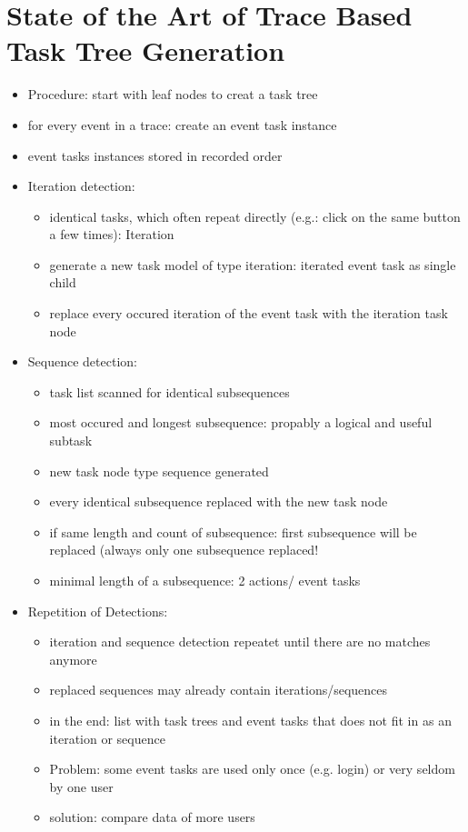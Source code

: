 \section{State of the Art of Trace Based Task Tree Generation}
\begin{itemize}
	\item Procedure: start with leaf nodes to creat a task tree
 	\item for every event in a trace: create an event task instance
  	\item event tasks instances stored in recorded order

	\item Iteration detection:
	\begin{itemize} 
		\item identical tasks, which often repeat directly (e.g.: click on the same button a few times): Iteration
		\item generate a new task model of type iteration: iterated event task as single child
		\item replace every occured iteration of the event task with the iteration task node 
	\end{itemize}

	\item Sequence detection:
	\begin{itemize}
		\item task list scanned for identical subsequences
    		\item most occured and longest subsequence: propably a logical and useful subtask
		\item new task node type sequence generated
		\item every identical subsequence replaced with the new task node 
		\item if same length and count of subsequence: first subsequence will be replaced (always only one subsequence replaced!
    		\item minimal length of a subsequence: 2 actions/ event tasks
	\end{itemize}
	\item Repetition of Detections:
	\begin{itemize}
		\item iteration and sequence detection repeatet until there are no matches anymore
  		\item replaced sequences may already contain iterations/sequences 
		\item in the end: list with task trees and event tasks that does not fit in as an iteration or sequence
		\item Problem: some event tasks are used only once (e.g. login) or very seldom by one user
		\item solution: compare data of more users 
	\end{itemize}
\end{itemize}

